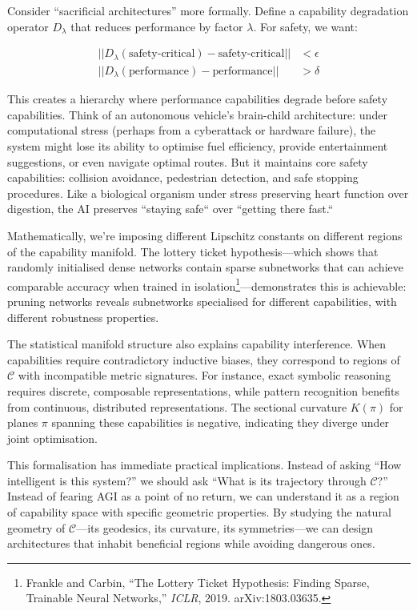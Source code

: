 \documentclass[acmsmall,screen]{acmart}
\begin{document}
Consider ``sacrificial architectures'' more formally. Define a capability degradation operator $D_\lambda$ that reduces performance by factor $\lambda$. For safety, we want:

\begin{align}
||D_\lambda(\text{safety-critical}) - \text{safety-critical}|| &< \epsilon \\ ||D_\lambda(\text{performance}) - \text{performance}|| &> \delta
\end{align}

This creates a hierarchy where performance capabilities degrade before safety capabilities.
Think of an autonomous vehicle's brain-child architecture: under computational stress (perhaps from a cyberattack or hardware failure), the system might lose its ability to optimise fuel efficiency, provide entertainment suggestions, or even navigate optimal routes.
But it maintains core safety capabilities: collision avoidance, pedestrian detection, and safe stopping procedures.
Like a biological organism under stress preserving heart function over digestion, the AI preserves ``staying safe`` over ``getting there fast.``

Mathematically, we're imposing different Lipschitz constants on different regions of the capability manifold.
The lottery ticket hypothesis---which shows that randomly initialised dense networks contain sparse subnetworks that can achieve comparable accuracy when trained in isolation\footnote{Frankle and Carbin, ``The Lottery Ticket Hypothesis: Finding Sparse, Trainable Neural Networks,'' \textit{ICLR}, 2019. arXiv:1803.03635.}---demonstrates this is achievable: pruning networks reveals subnetworks specialised for different capabilities, with different robustness properties.

The statistical manifold structure also explains capability interference. When capabilities require contradictory inductive biases, they correspond to regions of $\mathcal{C}$ with incompatible metric signatures. For instance, exact symbolic reasoning requires discrete, composable representations, while pattern recognition benefits from continuous, distributed representations. The sectional curvature $K(\pi)$ for planes $\pi$ spanning these capabilities is negative, indicating they diverge under joint optimisation.

This formalisation has immediate practical implications. Instead of asking ``How intelligent is this system?'' we should ask ``What is its trajectory through $\mathcal{C}$?'' Instead of fearing AGI as a point of no return, we can understand it as a region of capability space with specific geometric properties. By studying the natural geometry of $\mathcal{C}$---its geodesics, its curvature, its symmetries---we can design architectures that inhabit beneficial regions while avoiding dangerous ones.
\end{document}
